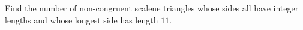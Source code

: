 Find the number of non-congruent scalene triangles whose sides all have integer lengths and whose longest side has length $11$.
